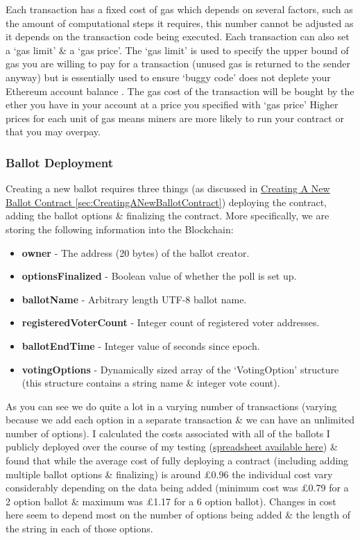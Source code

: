 \documentclass{article}
\begin{document}
	Each transaction has a fixed cost of gas which depends on several factors, such as the amount of computational steps it requires, this number cannot be adjusted as it depends on the transaction code being executed. Each transaction can also set a `gas limit' \& a `gas price'. The `gas limit' is used to specify the upper bound of gas you are willing to pay for a transaction (unused gas is returned to the sender anyway) but is essentially used to ensure `buggy code' does not deplete your Ethereum account balance \citep{57_introduction_ethereum_frontier_guide_2017}. The gas cost of the transaction will be bought by the ether you have in your account at a price you specified with `gas price' Higher prices for each unit of gas means miners are more likely to run your contract or that you may overpay. 
	
	\subsubsection{Ballot Deployment}
	Creating a new ballot requires three things (as discussed in \hyperref[sec:CreatingANewBallotContract]{Creating A New Ballot Contract \ref*{sec:CreatingANewBallotContract}}) deploying the contract, adding the ballot options \& finalizing the contract. More specifically, we are storing the following information into the Blockchain:
	\begin{itemize}
		\item \textbf{owner} - The address (20 bytes) of the ballot creator.
		\item \textbf{optionsFinalized} - Boolean value of whether the poll is set up.
		\item \textbf{ballotName} - Arbitrary length UTF-8 ballot name.
		\item \textbf{registeredVoterCount} - Integer count of registered voter addresses.
		\item \textbf{ballotEndTime} - Integer value of seconds since epoch.
		\item \textbf{votingOptions} - Dynamically sized array of the `VotingOption' structure (this structure contains a string name \& integer vote count).
	\end{itemize}
	
	As you can see we do quite a lot in a varying number of transactions (varying because we add each option in a separate transaction \& we can have an unlimited number of options). I calculated the costs associated with all of the ballots I publicly deployed over the course of my testing (\href{https://docs.google.com/spreadsheets/d/1dyLkpD-rdH4eHFEsdPrLEXX45YHl9XLGppbYgYYsTOo/edit?usp=sharing}{spreadsheet available here}) \& found that while the average cost of fully deploying a contract (including adding multiple ballot options \& finalizing) is around \pounds0.96 the individual cost vary considerably depending on the data being added (minimum cost was \pounds0.79 for a 2 option ballot \& maximum was \pounds1.17 for a 6 option ballot). Changes in cost here seem to depend most on the number of options being added \& the length of the string in each of those options.
	
\end{document}
